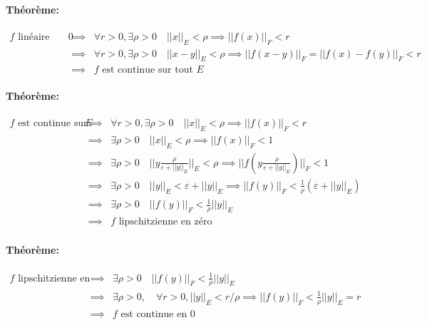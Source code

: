 \documentclass[a4paper, 11pt, french]{book}
\theoremstyle{plain} %
\theoremstyle{definition} %
\theoremstyle{remark} %
\newcommand{\1}{\mathds{1}}
\begin{document}
\paragraph{Théorème:}
$
	\begin{array}{rcl}
		\text{$f$ linéaire entre evn continue en $0$}
		  & \implies & \forall r > 0, \exists\rho > 0\quad ||x||_E <\rho\implies ||f(x)||_F < r                     \\
		  & \implies & \forall r > 0, \exists\rho > 0\quad ||x-y||_E <\rho\implies ||f(x-y)||_F=||f(x)-f(y)||_F < r \\
		  & \implies & \text{$f$ est continue sur tout $E$}
	\end{array}
$

\paragraph{Théorème:}
$
	\begin{array}{rcl}
		\text{$f$ est continue sur tout $E$}
		  & \implies & \forall r > 0, \exists\rho > 0\quad ||x||_E <\rho\implies ||f(x)||_F < r                                                      \\
		  & \implies & \exists\rho > 0\quad ||x||_E <\rho\implies ||f(x)||_F < 1                                                                     \\
		  & \implies & \exists\rho > 0\quad ||y\frac{\rho}{\varepsilon + ||y||_E}||_E <\rho\implies ||f(y\frac{\rho}{\varepsilon + ||y||_E})||_F < 1 \\
		  & \implies & \exists\rho > 0\quad ||y||_E <\varepsilon + ||y||_E\implies ||f(y)||_F <\frac{1}{\rho}(\varepsilon + ||y||_E)                 \\
		  & \implies & \exists\rho > 0\quad ||f(y)||_F <\frac{1}{\rho}||y||_E                                                                        \\
		  & \implies & \text{$f$ lipschitzienne en zéro}
	\end{array}
$

\paragraph{Théorème:}
$
	\begin{array}{rcl}
		\text{$f$ lipschitzienne en zéro}
		  & \implies & \exists\rho > 0\quad ||f(y)||_F <\frac{1}{\rho}||y||_E                                            \\
		  & \implies & \exists\rho > 0, \quad\forall r > 0, ||y||_E < r/\rho\implies ||f(y)||_F <\frac{1}{\rho}||y||_E=r \\
		  & \implies & \text{$f$ est continue en $0$}
	\end{array}
$
\end{document}
